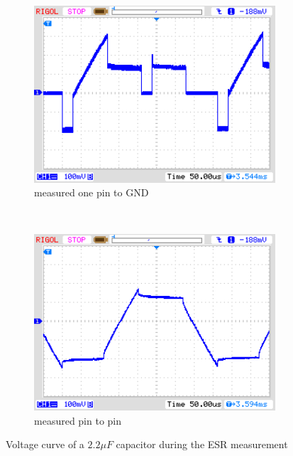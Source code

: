 \begin{figure}[H]
  \begin{subfigure}[b]{9cm}
    \centering
    \includegraphics[width=9cm]{../PNG/ESR_2uF_pin2GND.png}
    \caption{measured one pin to GND}
  \end{subfigure}
  ~ 
  \begin{subfigure}[b]{9cm}
    \centering
    \includegraphics[width=9cm]{../PNG/ESR_2uF_pin2pin.png}
    \caption{measured pin to pin}
  \end{subfigure}
  \caption{Voltage curve of a \(2.2\mu F\) capacitor during the ESR measurement}
  \label{pic:esr2}
\end{figure}




